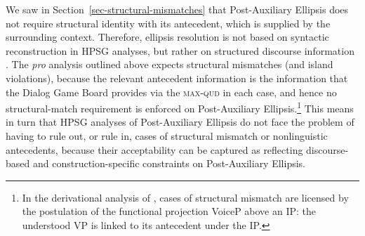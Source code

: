 We saw in Section~\ref{sec-structural-mismatches} that Post-Auxiliary Ellipsis does not require structural identity with its antecedent, which is supplied by the surrounding context. Therefore, ellipsis resolution is not based on syntactic reconstruction in HPSG analyses, but rather on structured discourse information \citep[see][295]{Ginzburg:Sag:2000}. %
%
The \emph{pro} analysis outlined above expects structural mismatches (and island violations), %
%
because the relevant antecedent information is the information that the Dialog Game Board provides via the \textsc{max-qud} in each case, and hence no structural-match requirement is enforced on Post-Auxiliary Ellipsis.\footnote{In the derivational
analysis of \citet{Merchant2013}, cases of structural mismatch are licensed by
the postulation of the functional projection VoiceP above an IP: the understood
VP is linked to its antecedent under the IP.} This means in turn that HPSG analyses of Post-Auxiliary Ellipsis do not face the problem of having to rule out, or rule in, cases of structural mismatch or nonlinguistic antecedents, because their acceptability can be captured as reflecting discourse-based and construction-specific constraints on Post-Auxiliary Ellipsis.



